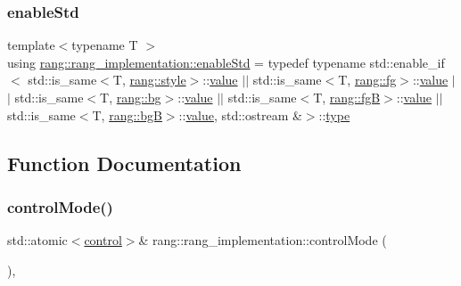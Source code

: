 \subsubsection{\texorpdfstring{enable\+Std}{enableStd}}
{\footnotesize\ttfamily template$<$typename T $>$ \\
using \mbox{\hyperlink{namespacerang_1_1rang__implementation_a769f245caecc8bdf2d741f39a48052ac}{rang\+::rang\+\_\+implementation\+::enable\+Std}} = typedef typename std\+::enable\+\_\+if$<$ std\+::is\+\_\+same$<$T, \mbox{\hyperlink{namespacerang_add4e682fec2856474978ff76efcc8b4e}{rang\+::style}}$>$\+::\mbox{\hyperlink{glad_8h_a7ab00df62abe96de01795dc0d15959db}{value}} $\vert$$\vert$ std\+::is\+\_\+same$<$T, \mbox{\hyperlink{namespacerang_a41a68f6ed991b29fa720fcfbcd319ef9}{rang\+::fg}}$>$\+::\mbox{\hyperlink{glad_8h_a7ab00df62abe96de01795dc0d15959db}{value}} $\vert$$\vert$ std\+::is\+\_\+same$<$T, \mbox{\hyperlink{namespacerang_ad33ed681a0b63f07283bbb55d19da7d2}{rang\+::bg}}$>$\+::\mbox{\hyperlink{glad_8h_a7ab00df62abe96de01795dc0d15959db}{value}} $\vert$$\vert$ std\+::is\+\_\+same$<$T, \mbox{\hyperlink{namespacerang_a3b83d0d73d49b5a75c3b92031f2c77ee}{rang\+::fgB}}$>$\+::\mbox{\hyperlink{glad_8h_a7ab00df62abe96de01795dc0d15959db}{value}} $\vert$$\vert$ std\+::is\+\_\+same$<$T, \mbox{\hyperlink{namespacerang_a42edf1c1b0d8e843ceb1208259177f08}{rang\+::bgB}}$>$\+::\mbox{\hyperlink{glad_8h_a7ab00df62abe96de01795dc0d15959db}{value}}, std\+::ostream \&$>$\+::\mbox{\hyperlink{glad_8h_a890efa53b3d7deeeced6f3a0d6653ed3}{type}}}



\subsection{Function Documentation}
\mbox{\label{namespacerang_1_1rang__implementation_a99f6a7aceb4c73be5583199d7c4bf608}} 
\subsubsection{\texorpdfstring{control\+Mode()}{controlMode()}}
{\footnotesize\ttfamily std\+::atomic$<$\mbox{\hyperlink{namespacerang_a9a0ad8048ed47f032f5bdb687ba64164}{control}}$>$\& rang\+::rang\+\_\+implementation\+::control\+Mode (\begin{DoxyParamCaption}{ }\end{DoxyParamCaption})\hspace{0.3cm}{\ttfamily [inline]}, {\ttfamily [noexcept]}}

